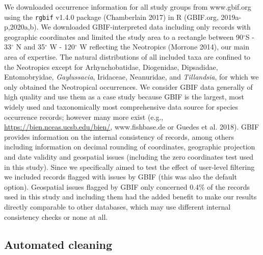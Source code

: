 \documentclass[fleqn,10pt,lineno]{wlpeerj} %
\begin{document}
We downloaded occurrence information for all study groups from www.gbif.org using the \texttt{rgbif} v1.4.0 package (Chamberlain 2017) in R (GBIF.org, 2019a-p,2020a,b). We downloaded GBIF-interpreted data including only records with geographic coordinates and limited the study area to a rectangle between 90\(^\circ\)S - 33\(^\circ\) N and 35\(^\circ\) W - 120\(^\circ\) W reflecting the Neotropics (Morrone 2014), our main area of expertise. The natural distributions of all included taxa are confined to the Neotropics except for Arhynchobatidae, Diogenidae, Dipsadidae, Entomobryidae, \emph{Gaylussacia}, Iridaceae, Neanuridae, and \emph{Tillandsia}, for which we only obtained the Neotropical occurrences. We consider GBIF data generally of high quality and use them as a case study because GBIF is the largest, most widely used and taxonomically most comprehensive data source for species occurrence records; however many more exist (e.g., \url{https://bien.nceas.ucsb.edu/bien/}, www.fishbase.de or Guedes et al. 2018). GBIF provides information on the internal consistency of records, among others including information on decimal rounding of coordinates, geographic projection and date validity and geospatial issues (including the zero coordinates test used in this study). Since we specifically aimed to test the effect of user-level filtering we included records flagged with issues by GBIF (this was also the default option). Geospatial issues flagged by GBIF only concerned 0.4\% of the records used in this study and including them had the added benefit to make our results directly comparable to other databases, which may use different internal consistency checks or none at all.

\hypertarget{automated-cleaning}{%
\subsection*{Automated cleaning}\label{automated-cleaning}}
\end{document}
